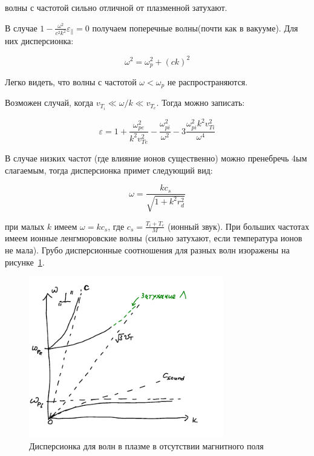 \documentclass[10pt, a4paper]{article}
\begin{document}
волны с частотой сильно отличной от плазменной затухают.

В случае $1 - \frac{\omega^2}{c^2 k^2} \varepsilon_{\parallel}=0$ получаем поперечные волны(почти как в вакууме). Для них
дисперсионка:

\begin{equation}
    \omega^2=\omega_p^2 + (c k)^2
\end{equation}

Легко видеть, что волны с частотой $\omega < \omega_p$ не распространяются.

Возможен случай, когда $v_{T_i} \ll \omega/k \ll v_{T_e}$. Тогда можно записать:

\begin{equation}
    \varepsilon=1+\frac{\omega_{pe}^2}{k^2 v_{Te}^2} - \frac{\omega_{pi}^2}{\omega^2}-3\frac{\omega_{pi}^2 k^2 v_{Ti}^2}{\omega^4}
\end{equation}

В случае низких частот (где влияние ионов существенно) можно пренебречь 4ым слагаемым, тогда дисперсионка примет следующий вид:

\begin{equation}
    \omega=\frac{k c_s}{\sqrt{1 + k^2 r_d^2}}
\end{equation}

при малых $k$ имеем $\omega=k c_s$, где $c_s=\frac{T_i + T_e}{M}$ (ионный звук). При больших частотах имеем ионные ленгмюровские волны (сильно затухают, если температура ионов не мала). Грубо дисперсионные соотношения для разных волн изоражены на рисунке~\ref{fig:disp_eq_without_B}.

\begin{figure}[ht]
	\begin{center}
		\includegraphics[width=85mm]{noB.pdf}
	\end{center}
	\caption{Дисперсионка для волн в плазме в отсутствии магнитного поля}
	\label{fig:disp_eq_without_B} 
\end{figure}
\end{document}
